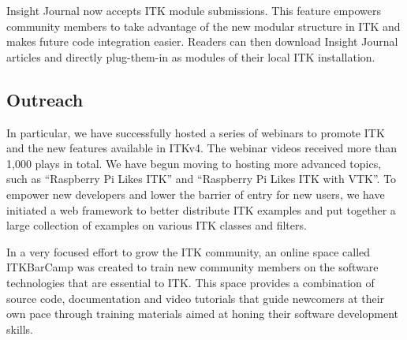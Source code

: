 \documentclass{frontiersENG} %
\begin{document}
Insight Journal now accepts ITK module submissions. This feature empowers community members to take advantage of the new modular structure in ITK and makes future code integration easier. Readers can then download Insight Journal articles and directly plug-them-in as modules of their local ITK installation.


\subsection{Outreach}
In particular, we have successfully hosted a series of webinars to promote ITK and the new features available in ITKv4. The webinar videos received more than 1,000 plays in total. We have begun moving to hosting more advanced topics, such as “Raspberry Pi Likes ITK” and “Raspberry Pi Likes ITK with VTK”. To empower new developers and lower the barrier of entry for new users, we have initiated a web framework to better distribute ITK examples and put together a large collection of examples on various ITK classes and filters.

In a very focused effort to grow the ITK community, an online space called ITKBarCamp was created to train new community members on the software technologies that are essential to ITK. This space provides a combination of source code, documentation and video tutorials that guide newcomers at their own pace through training materials aimed at honing their software development skills.
\end{document}
